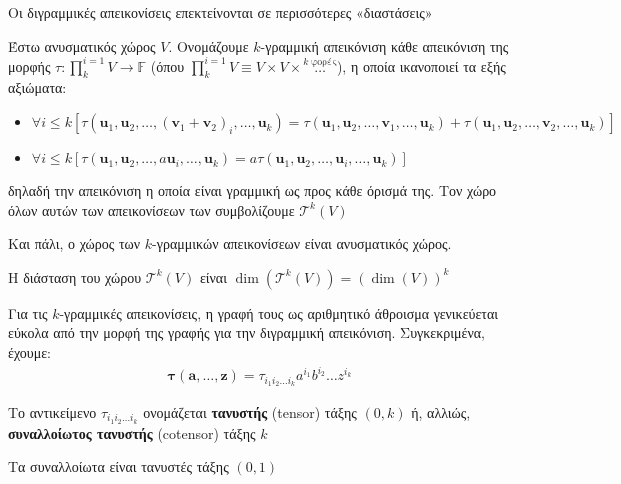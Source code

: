 \documentclass[main.tex]{subfiles}
\begin{document}
	Οι διγραμμικές απεικονίσεις επεκτείνονται σε περισσότερες «διαστάσεις»
	\begin{definition}
		Έστω ανυσματικός χώρος $V$. Ονομάζουμε $k$-γραμμική απεικόνιση κάθε απεικόνιση της μορφής $\tau:\prod_{k}^{i=1}V\rightarrow \mathbb{F}$ (όπου $\prod_{k}^{i=1}V \equiv V\times V\times \overset{k \; \text{φορές}}{\ldots}$), η οποία ικανοποιεί τα εξής αξιώματα:
		\begin{itemize}
			\item $\forall i\leq k[\tau(\boldsymbol{u}_1, \boldsymbol{u}_2,\ldots,(\boldsymbol{v}_{1} + \boldsymbol{v}_{2})_i,\ldots,\boldsymbol{u}_k) = \tau(\boldsymbol{u}_1, \boldsymbol{u}_2,\ldots,\boldsymbol{v}_{1},\ldots,\boldsymbol{u}_k) + \tau(\boldsymbol{u}_1, \boldsymbol{u}_2,\ldots,\boldsymbol{v}_{2},\ldots,\boldsymbol{u}_k)]$
			\item $\forall i\leq k[\tau(\boldsymbol{u}_1, \boldsymbol{u}_2,\ldots,a\boldsymbol{u}_i,\ldots,\boldsymbol{u}_k) = a\tau(\boldsymbol{u}_1, \boldsymbol{u}_2,\ldots,\boldsymbol{u}_i,\ldots,\boldsymbol{u}_k)]$
		\end{itemize}
		δηλαδή την απεικόνιση η οποία είναι γραμμική ως προς κάθε όρισμά της. Τον χώρο όλων αυτών των απεικονίσεων των συμβολίζουμε $\mathcal{T}^k(V)$
	\end{definition}
	Και πάλι, ο χώρος των $k$-γραμμικών απεικονίσεων είναι ανυσματικός χώρος.
	
	\begin{corollary}
		Η διάσταση του χώρου $\mathcal{T}^k(V)$ είναι $\dim(\mathcal{T}^k(V)) = (\dim(V))^k$
	\end{corollary}

	Για τις $k$-γραμμικές απεικονίσεις, η γραφή τους ως αριθμητικό άθροισμα γενικεύεται εύκολα από την μορφή της γραφής για την διγραμμική απεικόνιση. Συγκεκριμένα, έχουμε:
	\begin{align*}
		\boldsymbol{\tau}(\boldsymbol{a},\ldots,\boldsymbol{z}) = \tau_{i_1i_2\ldots i_k}a^{i_1}b^{i_2}\ldots z^{i_k}
	\end{align*}
	
	\begin{definition}
		Το αντικείμενο $\tau_{i_1i_2\ldots i_k}$ ονομάζεται \textbf{τανυστής} (tensor) τάξης $(0,k)$ ή, αλλιώς, \textbf{συναλλοίωτος τανυστής} (cotensor) τάξης $k$
	\end{definition}

	\begin{corollary}
		Τα συναλλοίωτα είναι τανυστές τάξης $(0,1)$
	\end{corollary}
	
\end{document}
